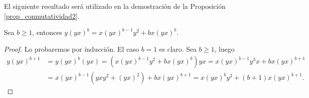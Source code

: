 \documentclass[a4paper,oneside,fleqn,11pt,../tesis.tex]{subfiles}
\begin{document}
El siguiente resultado será utilizado en la demostración de la Proposición \ref{prop_conmutatividad2}.
\begin{prop}
\label{prop_conmutatividad2_aux}
Sea $b \geq 1$, entonces $y(yx)^b = x(yx)^{b - 1}y^2 + bx(yx)^b$.
\end{prop}
\begin{proof}
Lo probaremos por inducción. El caso $b = 1$ es claro. Sea $b \geq 1$, luego
\begin{align*}
	y(yx)^{b + 1} &= y(yx)^b(yx) = (x(yx)^{b - 1}y^2 + bx(yx)^b)yx = x(yx)^{b - 1}y^3x + bx(yx)^{b + 1}\\
	&= x(yx)^{b - 1}(yxy^2 + (yx)^2) + bx(yx)^{b + 1} = x(yx)^{b}y^2 + (b + 1)x(yx)^{b + 1}.
\end{align*}
\end{proof}
\end{document}
